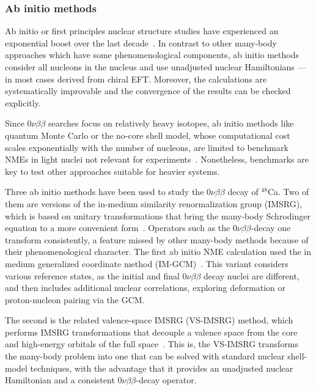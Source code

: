 \subsubsection{Ab initio methods}
\label{sec:ab_initio}

Ab initio or first principles nuclear structure studies have experienced an exponential boost over the last decade~\cite{Hergert:2020bxy,Ekstrom:2022yea}. In contrast to other many-body approaches which have some phenomenological components, ab initio methods consider all nucleons in the nucleus and use unadjusted nuclear Hamiltonians ---in most cases derived  from chiral EFT. Moreover, the calculations are systematically improvable and the convergence of the results can be checked explicitly.

Since $0\nu\beta\beta$ searches focus on relatively heavy isotopes, ab initio methods like quantum Monte Carlo or the no-core shell model, whose computational cost scales exponentially with the number of nucleons, are limited to benchmark NMEs in light nuclei not relevant for experiments~\cite{Pastore:2017ofx,Basili:2019gvn,Yao:2020olm}. Nonetheless, benchmarks are key to test other approaches suitable for heavier systems.

Three ab initio methods have been used to study the $0\nu\beta\beta$ decay of $^{48}$Ca. Two of them are versions of the in-medium similarity renormalization group (IMSRG), which is based on unitary transformations that bring the many-body Schrodinger equation to a more convenient form~\cite{Hergert:2015awm}. Operators such as the $0\nu\beta\beta$-decay one transform consistently, a feature missed by other many-body methods because of their phenomenological character. The first ab initio NME calculation used the in medium generalized coordinate method (IM-GCM)~\cite{Yao:2020olm}. This variant considers various reference states, as the initial and final $0\nu\beta\beta$ decay nuclei are different, and then includes additional nuclear correlations, exploring deformation  or proton-nucleon pairing via the GCM.

The second is the related valence-space IMSRG (VS-IMSRG) method, which performs IMSRG transformations that decouple a valence space from the core and high-energy orbitals of the full space~\cite{Stroberg:2019mxo}. This is, the VS-IMSRG transforms the many-body problem into one that can be solved with standard nuclear shell-model techniques, with the advantage that it provides an unadjusted nuclear Hamiltonian and a consistent $0\nu\beta\beta$-decay operator.

